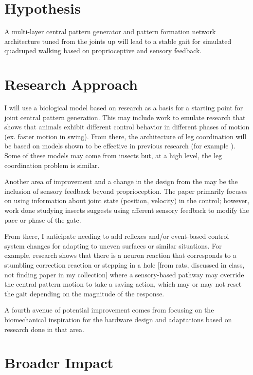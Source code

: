 \documentclass[12pt, letterpaper, oneside, notitlepage, onecolumn]{article}
\begin{document}
\section{Hypothesis}

A multi-layer central pattern generator and pattern formation network architecture tuned from the joints up will lead to a stable gait for simulated quadruped walking based on proprioceptive and sensory feedback.

\section{Research Approach}

I will use a biological model based on research \cite{Hunt2017, Zhong2012} as a basis for a starting point for joint central pattern generation. This may include work to emulate research that shows that animals exhibit different control behavior in different phases of motion (ex. faster motion in swing). From there, the architecture of leg coordination will be based on models shown to be effective in previous research (for example \cite{SzczecinskiThesis}). Some of these models may come from insects but, at a high level, the leg coordination problem is similar.

Another area of improvement and a change in the design from the \cite{Hunt2017} may be the inclusion of sensory feedback beyond proprioception. The paper primarily focuses on using information about joint state (position, velocity) in the control; however, work done studying insects suggests using afferent sensory feedback to modify the pace or phase of the gate. \cite{Varilly2008}

From there, I anticipate needing to add reflexes and/or event-based control system changes for adapting to uneven surfaces or similar situations. For example, research shows that there is a neuron reaction that corresponds to a stumbling correction reaction \cite{Varilly2008} or stepping in a hole [from rats, discussed in class, not finding paper in my collection] where a sensory-based pathway may override the central pattern motion to take a saving action, which may or may not reset the gait depending on the magnitude of the response.

A fourth avenue of potential improvement comes from focusing on the biomechanical inspiration for the hardware design and adaptations based on research done in that area. \cite{Smith2015}

\section{Broader Impact}
\end{document}
